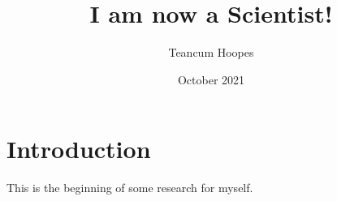 \documentclass[12pt, letterpaper, twoside]{article}
\title{I am now a Scientist!}
\author{Teancum Hoopes}
\date{October 2021}
\begin{document}
\begin{titlepage}
\maketitle
\end{titlepage}

\section{Introduction}
This is the beginning of some research for myself.
\end{document}
